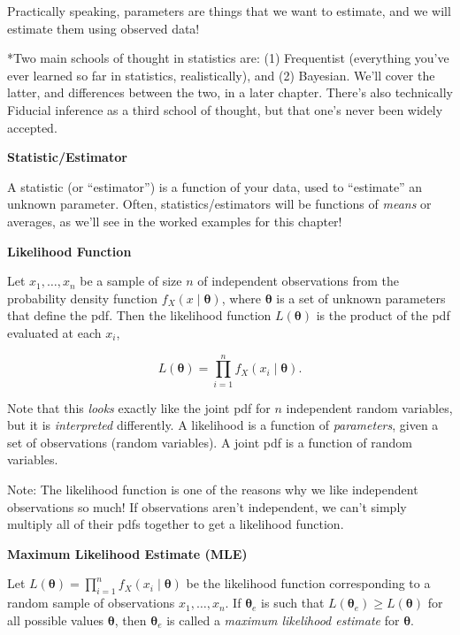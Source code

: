 \documentclass[
  letterpaper,
  DIV=11,
  numbers=noendperiod]{scrreprt}
\begin{document}
Practically speaking, parameters are things that we want to estimate,
and we will estimate them using observed data!

*Two main schools of thought in statistics are: (1) Frequentist
(everything you've ever learned so far in statistics, realistically),
and (2) Bayesian. We'll cover the latter, and differences between the
two, in a later chapter. There's also technically Fiducial inference as
a third school of thought, but that one's never been widely accepted.

\textbf{Statistic/Estimator}

A statistic (or ``estimator'') is a function of your data, used to
``estimate'' an unknown parameter. Often, statistics/estimators will be
functions of \emph{means} or averages, as we'll see in the worked
examples for this chapter!

\textbf{Likelihood Function}

Let \(x_1, \dots, x_n\) be a sample of size \(n\) of independent
observations from the probability density function
\(f_X(x \mid \boldsymbol{\theta})\), where \(\boldsymbol{\theta}\) is a
set of unknown parameters that define the pdf. Then the likelihood
function \(L(\boldsymbol{\theta})\) is the product of the pdf evaluated
at each \(x_i\),

\[
L(\boldsymbol{\theta}) = \prod_{i = 1}^n f_X(x_i \mid \boldsymbol{\theta}).
\]

Note that this \emph{looks} exactly like the joint pdf for \(n\)
independent random variables, but it is \emph{interpreted} differently.
A likelihood is a function of \emph{parameters}, given a set of
observations (random variables). A joint pdf is a function of random
variables.

Note: The likelihood function is one of the reasons why we like
independent observations so much! If observations aren't independent, we
can't simply multiply all of their pdfs together to get a likelihood
function.

\textbf{Maximum Likelihood Estimate (MLE)}

Let
\(L(\boldsymbol{\theta}) = \prod_{i = 1}^n f_X(x_i \mid \boldsymbol{\theta})\)
be the likelihood function corresponding to a random sample of
observations \(x_1, \dots, x_n\). If \(\boldsymbol{\theta}_e\) is such
that \(L(\boldsymbol{\theta}_e) \geq L(\boldsymbol{\theta})\) for all
possible values \(\boldsymbol{\theta}\), then \(\boldsymbol{\theta}_e\)
is called a \emph{maximum likelihood estimate} for
\(\boldsymbol{\theta}\).
\end{document}
